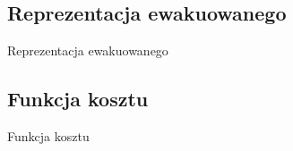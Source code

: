 \subsection{Reprezentacja ewakuowanego}
\begin{frame}{Reprezentacja ewakuowanego}
\end{frame}

\subsection{Funkcja kosztu}
\begin{frame}{Funkcja kosztu}
\end{frame}